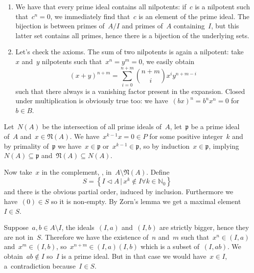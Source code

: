 \begin{exercise}
  \label{exercise:42o}
  \begin{enumerate}
    \item We have that every prime ideal contains all nilpotents: if~$c$ is a nilpotent such that~$c^n=0$, we immediately find that~$c$ is an element of the prime ideal. The bijection is between primes of~$A/I$ and primes of~$A$ containing~$I$, but this latter set contains all primes, hence there is a bijection of the underlying sets.

    \item\label{enumerate:42o-b} Let's check the axioms. The sum of two nilpotents is again a nilpotent: take~$x$ and~$y$ nilpotents such that~$x^n=y^m=0$, we easily obtain
      \begin{equation}
        (x+y)^{n+m}=\sum_{i=0}^{n+m}\binom{n+m}{i}x^iy^{n+m-i}
      \end{equation}
      such that there always is a vanishing factor present in the expansion. Closed under multiplication is obviously true too: we have~$(bx)^n=b^nx^n=0$ for~$b\in B$.
  \end{enumerate}
\end{exercise}

\begin{exercise}
  Let~$N(A)$ be the intersection of all prime ideals of~$A$, let~$\mathfrak{p}$ be a prime ideal of~$A$ and~$x\in\mathfrak{N}(A)$. We have~$x^{k-1}x=0\in P$ for some positive integer~$k$ and by primality of~$\mathfrak{p}$ we have~$x\in\mathfrak{p}$ or~$x^{k-1}\in\mathfrak{p}$, so by induction~$x\in\mathfrak{p}$, implying~$N(A)\subseteq\mathfrak{p}$ and~$\mathfrak{N}(A)\subseteq N(A)$.

  Now take~$x$ in the complement, \ie, in~$A\setminus\mathfrak{N}(A)$. Define
  \begin{equation}
    S=\left\{ I\triangleleft A\,|\,x^k\notin I\forall k\in\mathbb{N}_0 \right\}
  \end{equation}
  and there is the obvious partial order, induced by inclusion. Furthermore we have~$(0)\in S$ so it is non-empty. By Zorn's lemma we get a maximal element~$I\in S$.

  Suppose~$a,b\in A\setminus I$, the ideals~$(I,a)$ and~$(I,b)$ are strictly bigger, hence they are not in~$S$. Therefore we have the existence of~$n$ and~$m$ such that~$x^n\in(I,a)$ and~$x^m\in(I,b)$, so~$x^{n+m}\in(I,a)(I,b)$ which is a subset of~$(I,ab)$. We obtain~$ab\notin I$ so~$I$ is a prime ideal. But in that case we would have~$x\in I$, a~contradiction because~$I\in S$.
\end{exercise}

